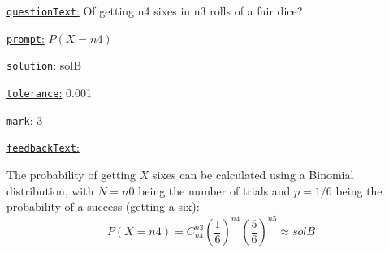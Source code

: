 \documentclass[preview]{standalone}
\newcommand \fieldname[1]{\underline{\texttt{#1}:}}
\begin{document}
\fieldname{questionText}
Of getting {n4} sixes in {n3} rolls of a fair dice?

\fieldname{prompt}
$P(X = {n4})$

\fieldname{solution}
solB

\fieldname{tolerance}
0.001

\fieldname{mark}
3

\fieldname{feedbackText}

The probability of getting $X$ sixes can be calculated using a Binomial distribution, with $N={n0}$ being the number of trials and $p=1/6$ being the probability of a success (getting a six):
\[
P(X = {n4})  = C^{{n3}}_{{n4}}  \left(\frac{1}{6}\right)^{{n4}} \left(\frac{5}{6}\right)^{{n5}} \approx {solB}
\]


\end{document}
